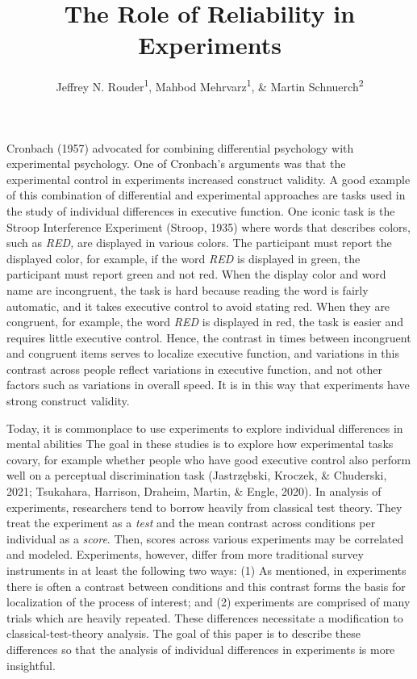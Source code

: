 \documentclass[
  ,man]{apa6}
\title{The Role of Reliability in Experiments}
\author{Jeffrey N. Rouder\textsuperscript{1}, Mahbod Mehrvarz\textsuperscript{1}, \& Martin Schnuerch\textsuperscript{2}}
\date{}
\affiliation{\vspace{0.5cm}\textsuperscript{1} University of California, Irvine\\\textsuperscript{2} University of Mannheim}
\begin{document}
\maketitle

Cronbach (1957) advocated for combining differential psychology with experimental psychology. One of Cronbach's arguments was that the experimental control in experiments increased construct validity. A good example of this combination of differential and experimental approaches are tasks used in the study of individual differences in executive function. One iconic task is the Stroop Interference Experiment (Stroop, 1935) where words that describes colors, such as \emph{RED,} are displayed in various colors. The participant must report the displayed color, for example, if the word \emph{RED} is displayed in green, the participant must report green and not red. When the display color and word name are incongruent, the task is hard because reading the word is fairly automatic, and it takes executive control to avoid stating red. When they are congruent, for example, the word \emph{RED} is displayed in red, the task is easier and requires little executive control. Hence, the contrast in times between incongruent and congruent items serves to localize executive function, and variations in this contrast across people reflect variations in executive function, and not other factors such as variations in overall speed. It is in this way that experiments have strong construct validity.

Today, it is commonplace to use experiments to explore individual differences in mental abilities The goal in these studies is to explore how experimental tasks covary, for example whether people who have good executive control also perform well on a perceptual discrimination task (Jastrzębski, Kroczek, \& Chuderski, 2021; Tsukahara, Harrison, Draheim, Martin, \& Engle, 2020). In analysis of experiments, researchers tend to borrow heavily from classical test theory. They treat the experiment as a \emph{test} and the mean contrast across conditions per individual as a \emph{score}. Then, scores across various experiments may be correlated and modeled. Experiments, however, differ from more traditional survey instruments in at least the following two ways: (1) As mentioned, in experiments there is often a contrast between conditions and this contrast forms the basis for localization of the process of interest; and (2) experiments are comprised of many trials which are heavily repeated. These differences necessitate a modification to classical-test-theory analysis. The goal of this paper is to describe these differences so that the analysis of individual differences in experiments is more insightful.
\end{document}

